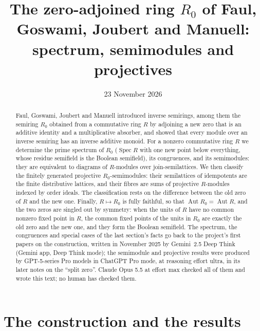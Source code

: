 \documentclass[11pt]{amsart}
\title[Spectrum, semimodules and projectives of $R_0$]{The zero-adjoined ring $R_0$ of Faul, Goswami, Joubert and Manuell: spectrum, semimodules and projectives}
\author{}
\date{23 November 2026}
\theoremstyle{remark}
\DeclareMathOperator{\Spec}{Spec}
\begin{document}
\begin{abstract}
Faul, Goswami, Joubert and Manuell introduced inverse semirings, among them the semiring $R_0$ obtained from a commutative ring $R$ by adjoining a new zero that is an additive identity and a multiplicative absorber, and showed that every module over an inverse semiring has an inverse additive monoid. For a nonzero commutative ring $R$ we determine the prime spectrum of $R_0$ ($\Spec R$ with one new point below everything, whose residue semifield is the Boolean semifield), its congruences, and its semimodules: they are equivalent to diagrams of $R$-modules over join-semilattices. We then classify the finitely generated projective $R_0$-semimodules: their semilattices of idempotents are the finite distributive lattices, and their fibres are sums of projective $R$-modules indexed by order ideals. The classification rests on the difference between the old zero of $R$ and the new one. Finally, $R\mapsto R_0$ is fully faithful, so that $\operatorname{Aut}R_0=\operatorname{Aut}R$, and the two zeros are singled out by symmetry: when the units of $R$ have no common nonzero fixed point in $R$, the common fixed points of the units in $R_0$ are exactly the old zero and the new one, and they form the Boolean semifield. The spectrum, the congruences and special cases of the last section's facts go back to the project's first papers on the construction, written in November 2025 by Gemini~2.5 Deep Think (Gemini app, Deep Think mode); the semimodule and projective results were produced by GPT-5-series Pro models in ChatGPT Pro mode, at reasoning effort ultra, in its later notes on the ``split zero''. Claude Opus 5.5 at effort max checked all of them and wrote this text; no human has checked them.
\end{abstract}

\maketitle

\section{The construction and the results}
\end{document}
